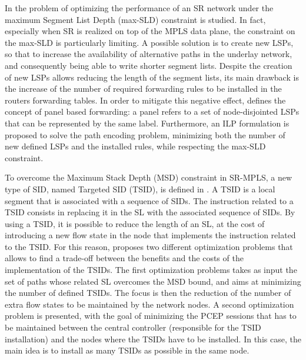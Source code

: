 In \cite{liaoruo2018optimizing} the problem of optimizing the performance of an SR network under the maximum Segment List Depth (max-SLD) constraint is studied.
In fact, especially when SR is realized on top of the MPLS data plane, the constraint on the max-SLD is particularly limiting.
A possible solution is to create new LSPs, so that to increase the availability of alternative paths in the underlay network, and consequently being able to write shorter segment lists.
Despite the creation of new LSPs allows reducing the length of the segment lists, its main drawback is the increase of the number of required forwarding rules to be installed in the routers forwarding tables.
In order to mitigate this negative effect, \cite{liaoruo2018optimizing} defines the concept of panel based forwarding: a panel refers to a set of node-disjointed LSPs that can be represented by the same label.
Furthermore, an ILP formulation is proposed to solve the path encoding problem, minimizing both the number of new defined LSPs and the installed rules, while respecting the max-SLD constraint.

To overcome the Maximum Stack Depth (MSD) constraint in SR-MPLS, a new type of SID, named Targeted SID (TSID), is defined in \cite{guedrez2017new}.
A TSID is a local segment that is associated with a sequence of SIDs. 
The instruction related to a TSID consists in replacing it in the SL with the associated sequence of SIDs.
By using a TSID, it is possible to reduce the length of an SL, at the cost of introducing a new flow state in the node that implements the instruction related to the TSID.
For this reason, \cite{guedrez2017new} proposes two different optimization problems that allows to find a trade-off between the benefits and the costs of the implementation of the TSIDs.
The first optimization problems takes as input the set of paths whose related SL overcomes the MSD bound, and aims at minimizing the number of defined TSIDs. 
The focus is then the reduction of the number of extra flow states to be maintained by the network nodes.
A second optimization problem is presented, with the goal of minimizing the PCEP sessions that has to be maintained between the central controller (responsible for the TSID installation) and the nodes where the TSIDs have to be installed.
In this case, the main idea is to install as many TSIDs as possible in the same node.

